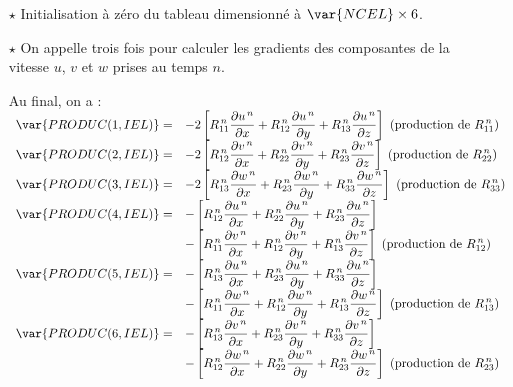 \begin{itemize}
\item [$\star$] Initialisation \`a z\'ero du tableau  dimensionn\'e \`a $\var{NCEL}\times 6$.
\item [$\star$] On appelle trois fois  pour calculer les gradients des composantes de la vitesse $u$, $v$ et
$w$ prises au temps $n$.

Au final, on a :\\
$\displaystyle
\begin{array} {ll}
\var{PRODUC(1,IEL)} = & \displaystyle - 2 \left[ R_{11}^{\,n} \frac{\partial u^{\,n}} {\partial x} +R_{12}^{\,n} \frac{\partial u^{\,n}} {\partial y}+R_{13}^{\,n} \frac{\partial u^{\,n}} {\partial z} \right] \text{        (production de $R_{11}^{\,n}$)}\\
\var{PRODUC(2,IEL)} = & \displaystyle - 2 \left[ R_{12}^{\,n} \frac{\partial v^{\,n}} {\partial x} +R_{22}^{\,n} \frac{\partial v^{\,n}} {\partial y}+R_{23}^{\,n} \frac{\partial v^{\,n}} {\partial z} \right] \text{        (production de $R_{22}^{\,n}$)}\\
\var{PRODUC(3,IEL)} = & \displaystyle - 2 \left[ R_{13}^{\,n} \frac{\partial w^{\,n}} {\partial x} +R_{23}^{\,n} \frac{\partial w^{\,n}} {\partial y}+R_{33}^{\,n} \frac{\partial w^{\,n}} {\partial z} \right] \text{        (production de $R_{33}^{\,n}$)}\\
\var{PRODUC(4,IEL)} = & \displaystyle - \left[ R_{12}^{\,n} \frac{\partial u^{\,n}} {\partial x} +R_{22}^{\,n} \frac{\partial u^{\,n}} {\partial y}+R_{23}^{\,n} \frac{\partial u^{\,n}} {\partial z} \right] \\
& \displaystyle - \left[ R_{11}^{\,n} \frac{\partial v^{\,n}} {\partial x} +R_{12}^{\,n} \frac{\partial v^{\,n}} {\partial y}+R_{13}^{\,n} \frac{\partial v^{\,n}} {\partial z} \right] \text{        (production de $R_{12}^{\,n}$)} \\
\var{PRODUC(5,IEL)} = & \displaystyle - \left[ R_{13}^{\,n} \frac{\partial u^{\,n}} {\partial x} +R_{23}^{\,n} \frac{\partial u^{\,n}} {\partial y}+R_{33}^{\,n} \frac{\partial u^{\,n}} {\partial z} \right] \\
& \displaystyle - \left[ R_{11}^{\,n} \frac{\partial w^{\,n}} {\partial x} +R_{12}^{\,n} \frac{\partial w^{\,n}} {\partial y}+R_{13}^{\,n} \frac{\partial w^{\,n}} {\partial z} \right] \text{        (production de $R_{13}^{\,n}$)} \\
\var{PRODUC(6,IEL)} = & \displaystyle - \left[ R_{13}^{\,n} \frac{\partial v^{\,n}} {\partial x} +R_{23}^{\,n} \frac{\partial v^{\,n}} {\partial y}+R_{33}^{\,n} \frac{\partial v^{\,n}} {\partial z} \right] \\
& \displaystyle - \left[ R_{12}^{\,n} \frac{\partial w^{\,n}} {\partial x} +R_{22}^{\,n} \frac{\partial w^{\,n}} {\partial y}+R_{23}^{\,n} \frac{\partial w^{\,n}} {\partial z} \right]  \text{        (production de $R_{23}^{\,n}$)}
\end{array}
$
\end{itemize}

